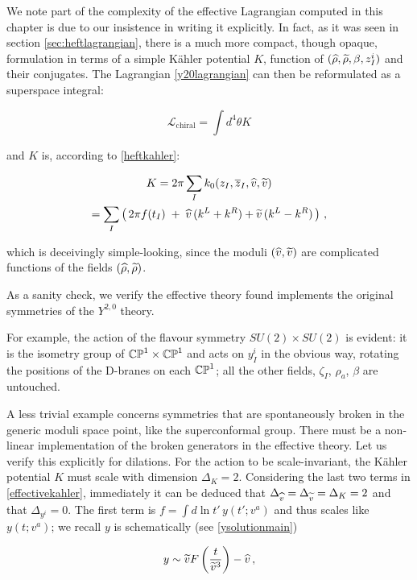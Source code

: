 We note part of the complexity of the effective Lagrangian computed in this chapter is due to our insistence in writing it explicitly. In fact, as it was seen in section \ref{sec:heftlagrangian}, there is a much more compact, though opaque, formulation in terms of a simple K\"ahler potential $K$, function of $(\widehat{\rho},\widetilde{\rho},\beta,z_I^i)$ and their conjugates. The Lagrangian \eqref{y20lagrangian} can then be reformulated as a superspace integral:

\begin{equation}
	\mathcal{L}_\mathrm{chiral} = \int d^4 \theta K
	\label{}
\end{equation}

and $K$ is, according to \eqref{heftkahler}:

\begin{gather}
	K = 2\pi \sum_I k_0(z_I, \overline{z}_I,\widehat{v}, \widetilde{v}) \\
	= \sum_I \left(\, 2\pi f(t_I) \;+\; \widehat{v}\, (k^L + k^R) + \widetilde{v}\,(k^L - k^R)\, \right)\,,
	\label{effectivekahler}
\end{gather}

which is deceivingly simple-looking, since the moduli $(\widehat{v},\widetilde{v})$ are complicated functions of the fields $(\widehat{\rho},\widetilde{\rho})$.

As a sanity check, we verify the effective theory found implements the original symmetries of the $Y^{2,0}$ theory. 

For example, the action of the flavour symmetry $SU(2) \times SU(2)$ is evident: it is the isometry group of $\mathbb{CP}^1 \times \mathbb{CP}^1$ and acts on $y^i_I$ in the obvious way, rotating the positions of the D-branes on each $\mathbb{CP}^1$; all the other fields, $\zeta_I$, $\rho_a$, $\beta$ are untouched.

A less trivial example concerns symmetries that are spontaneously broken in the generic moduli space point, like the superconformal group. There must be a non-linear implementation of the broken generators in the effective theory. Let us verify this explicitly for dilations. For the action to be scale-invariant, the K\"ahler potential $K$ must scale with dimension $\Delta_K = 2$. Considering the last two terms in \eqref{effectivekahler}, immediately it can be deduced that $\Delta_{\widehat{v}} = \Delta_{\widetilde{v}} = \Delta_K = 2$ and that $\Delta_{y^i}=0$. The first term is $f = \int d\ln t' \, y(t';v^a)$ and thus scales like $y(t;v^a)$; we recall $y$ is schematically (see \eqref{ysolutionmain})

\begin{equation}
	y \sim \widetilde{v} F\left( \frac{t}{{\widetilde{v}}^3} \right) - \widehat{v}\,,
	\label{}
\end{equation}

